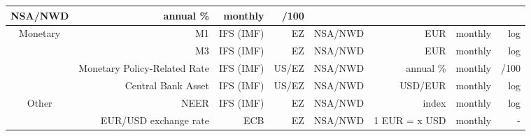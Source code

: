 \documentclass[11pt,a4paper]{article}
\begin{document}
\begin{center}
\begin{table}[h]
{\begin{tabular}{crrrrrrr}
      NSA/NWD &
      annual \% &
      monthly &
      /100
      \\
      \midrule
    \multirow{4}[8]{*}{Monetary} &
      M1 &
      IFS (IMF) &
      EZ &
      NSA/NWD &
      EUR &
      monthly &
      log
      \\
     &
      M3 &
      IFS (IMF) &
      EZ &
      NSA/NWD &
      EUR &
      monthly &
      log
      \\
     &
      Monetary Policy-Related Rate &
      IFS (IMF) &
      US/EZ &
      NSA/NWD &
      annual \% &
      monthly &
      /100
      \\
     &
      Central Bank Asset &
      IFS (IMF) &
      US/EZ &
      NSA/NWD &
      USD/EUR &
      monthly &
      log
      \\
      \midrule
    \multirow{2}[4]{*}{Other} &
      NEER &
      IFS (IMF) &
      EZ &
      NSA/NWD &
      index &
      monthly &
      log
      \\
     &
      EUR/USD exchange rate &
      ECB &
      EZ &
      NSA/NWD &
      1 EUR = x USD &
      monthly &
      -
      
      \\
    \bottomrule
    \end{tabular}
    }

\end{table}
\end{center}
\end{document}
